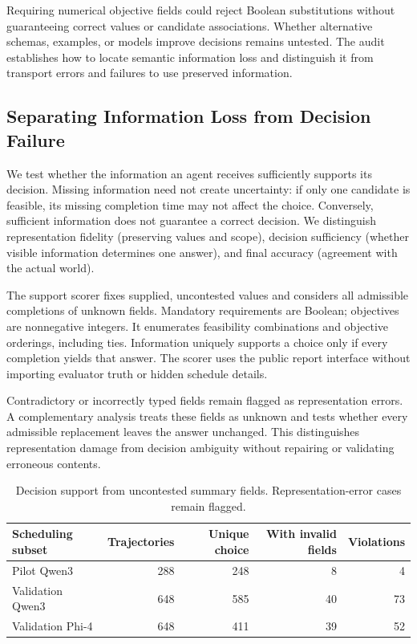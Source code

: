 \documentclass{svproc}
\begin{document}
Requiring numerical objective fields could reject Boolean substitutions without guaranteeing correct values or candidate associations. Whether alternative schemas, examples, or models improve decisions remains untested. The audit establishes how to locate semantic information loss and distinguish it from transport errors and failures to use preserved information.






\subsection{Separating Information Loss from Decision Failure}
We test whether the information an agent receives sufficiently supports its decision. Missing information need not create uncertainty: if only one candidate is feasible, its missing completion time may not affect the choice. Conversely, sufficient information does not guarantee a correct decision. We distinguish representation fidelity (preserving values and scope), decision sufficiency (whether visible information determines one answer), and final accuracy (agreement with the actual world).

The support scorer fixes supplied, uncontested values and considers all admissible completions of unknown fields. Mandatory requirements are Boolean; objectives are nonnegative integers. It enumerates feasibility combinations and objective orderings, including ties. Information uniquely supports a choice only if every completion yields that answer. The scorer uses the public report interface without importing evaluator truth or hidden schedule details.

Contradictory or incorrectly typed fields remain flagged as representation errors. A complementary analysis treats these fields as unknown and tests whether every admissible replacement leaves the answer unchanged. This distinguishes representation damage from decision ambiguity without repairing or validating erroneous contents.

\begin{table}[htbp]
\centering\small
\setlength{\tabcolsep}{4pt}
\caption{Decision support from uncontested summary fields. Representation-error cases remain flagged.}\label{tab:sufficiency}
\begin{tabular}{lrrrr}\toprule
Scheduling subset & Trajectories & Unique choice & With invalid fields & Violations\\\midrule
Pilot Qwen3 & 288 & 248 & 8 & 4\\
Validation Qwen3 & 648 & 585 & 40 & 73\\
Validation Phi-4 & 648 & 411 & 39 & 52\\
\bottomrule\end{tabular}
\end{table}
\end{document}
